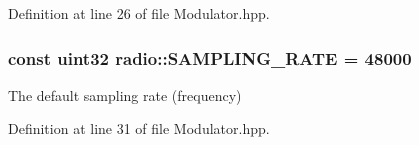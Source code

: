 Definition at line 26 of file Modulator.\+hpp.

\hypertarget{namespaceradio_a284213fea4beed2f74bb936927cbe654}{
\subsubsection[{S\+A\+M\+P\+L\+I\+N\+G\+\_\+\+R\+A\+T\+E}]{\setlength{\rightskip}{0pt plus 5cm}const {\bf uint32} radio\+::\+S\+A\+M\+P\+L\+I\+N\+G\+\_\+\+R\+A\+T\+E = 48000}}\label{namespaceradio_a284213fea4beed2f74bb936927cbe654}
The default sampling rate (frequency) 

Definition at line 31 of file Modulator.\+hpp.

